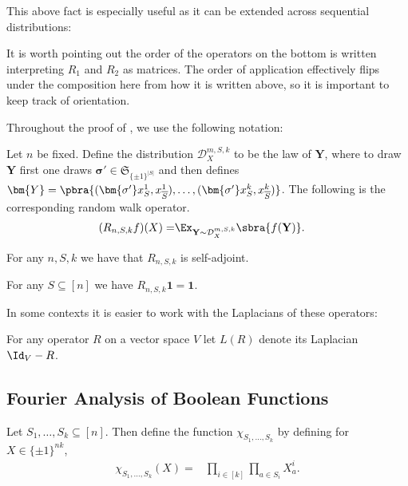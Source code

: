 This above fact is especially useful as it can be extended across sequential distributions:
It is worth pointing out the order of the operators on the bottom is written interpreting $R_1$ and $R_2$ as matrices. The order of application effectively flips under the composition here from how it is written above, so it is important to keep track of orientation.

Throughout the proof of , we use the following notation:
\begin{definition}\label{def:the random walk operator}
    Let $n$ be fixed. Define the distribution $\mathcal{D}^{m,S,k}_X$ to be the law of $\bm{Y}$, where to draw $\bm{Y}$ first one draws $\bm{\sigma'}\in \mathfrak{S}_{\{\pm1\}^{|S|}}$ and then defines $\bm{Y} = \pbra{(\bm{\sigma'}x^1_S,x^1_{\overline S}),\dots,(\bm{\sigma'}x^k_S,x^k_{\overline S})}$. The following is the corresponding random walk operator.
    \begin{align*}
        (R_{n,S,k}f)(X)=& \Ex_{\mathbf{Y} \sim\mathcal{D}^{m,S,k}_{X}}\sbra{f(\mathbf{Y})}.
    \end{align*}
\end{definition}



\begin{fact}\label{fact:self-adjoint}
    For any $n,S,k$ we have that $R_{n,S,k}$ is self-adjoint.
\end{fact}

\begin{fact}\label{fact:uniform is stationary}
    For any $S\subseteq[n]$ we have $R_{n,S,k}\mathbf{1}=\mathbf{1}$.
\end{fact}

In some contexts it is easier to work with the Laplacians of these operators:
\begin{definition}
    For any operator $R$ on a vector space $V$ let $L(R)$ denote its Laplacian $\Id_V-R$. 
\end{definition}

\subsection{Fourier Analysis of Boolean Functions}
\begin{definition}
    Let $S_1,\dots,S_k\subseteq[n]$. Then define the function $\chi_{S_1,\dots,S_k}$ by defining for $X\in\{\pm1\}^{nk}$,
    \begin{align*}
        \chi_{S_1,\dots,S_k}(X)=&\prod_{i\in [k]}\prod_{a\in S_i}X^i_a.
    \end{align*}
\end{definition}

